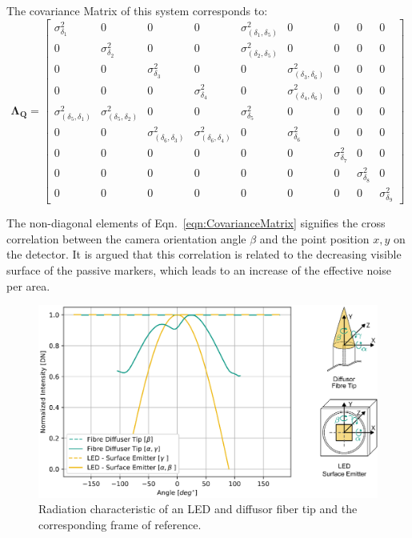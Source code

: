 \documentclass[5p,times,procedia]{elsarticle}
\begin{document}
The covariance Matrix of this system \cite{Liu_2021} corresponds to:
\begin{equation}
	\label{eqn:CovarianceMatrix}
	\mathbf{\Lambda_{Q}} = 
	\begin{bmatrix}
		\sigma_{\delta_1}^2  & 0 & 0 & 0 & \sigma_{(\delta_1,\delta_5)}^2 & 0 & 0 & 0 & 0 \\
		0  & \sigma_{\delta_2}^2 & 0 & 0 & \sigma_{(\delta_2,\delta_5)}^2 & 0 & 0 & 0 & 0 \\
		0 & 0 & \sigma_{\delta_3}^2 & 0 & 0 & \sigma_{(\delta_3,\delta_6)}^2 & 0 & 0 & 0 \\
		0 & 0 & 0 & \sigma_{\delta_4}^2 & 0 & \sigma_{(\delta_4,\delta_6)}^2 & 0 & 0 & 0 \\
		\sigma_{(\delta_5,\delta_1)}^2 & \sigma_{(\delta_5,\delta_2)}^2 & 0 & 0 & \sigma_{\delta_5}^2 & 0 & 0 & 0 & 0 \\
		0 & 0 & \sigma_{(\delta_6,\delta_3)}^2 & \sigma_{(\delta_6,\delta_4)}^2 & 0 & \sigma_{\delta_6}^2 & 0 & 0 & 0 \\
		0 & 0 & 0 & 0 & 0 & 0 & \sigma_{\delta_7}^2 & 0 & 0 \\
		0 & 0 & 0 & 0 & 0 & 0 & 0 & \sigma_{\delta_8}^2 & 0 \\
		0 & 0 & 0 & 0 & 0 & 0 & 0 & 0 & \sigma_{\delta_9}^2
	\end{bmatrix}
\end{equation}

The non-diagonal elements of Eqn.~\ref{eqn:CovarianceMatrix} signifies the cross correlation between the camera orientation angle $\beta$ and the point position $x,y$ on the detector. It is argued \cite{Liu_2021} that this correlation is related to the decreasing visible surface of the passive markers, which leads to an increase of the effective noise per area.

\begin{figure}[!htb]
	\centering
	\includegraphics[width=0.95\linewidth]{graphics/ScatteringProfile_DiffuseFibreTip.eps}
	\caption{Radiation characteristic of an LED and diffusor fiber tip and the corresponding frame of reference.}
	\label{fig:scat_profile}
\end{figure}
\end{document}
